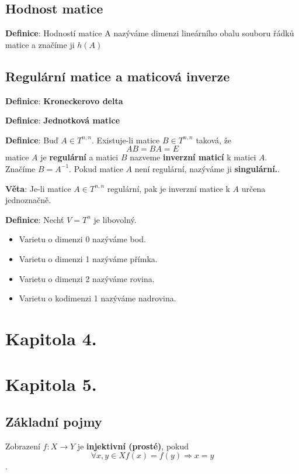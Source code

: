 \documentclass[12pt, letterpaper, twoside]{article}
\begin{document}
\subsection{Hodnost matice}

\textbf{Definice}: Hodností matice A nazýváme dimenzi lineárního obalu souboru řádků matice a značíme ji $h(A)$

\subsection{Regulární matice a maticová inverze}

\textbf{Definice}: \textbf{Kroneckerovo delta}

\textbf{Definice}: \textbf{Jednotková matice}

\textbf{Definice}: Buď $A \in T^{n,n}$. Existuje-li matice $B \in T^{n,n}$ taková, že
\[
    AB = BA = E
\] matice $A$ je \textbf{regulární} a matici $B$ nazveme \textbf{inverzní maticí} k matici $A$.
Značíme $B = A^{-1}$. Pokud matice $A$ není regulární, nazýváme ji \textbf{singulární.}.

\textbf{Věta}: Je-li matice $A \in T^{n,n}$ regulární, pak je inverzní matice k $A$ určena jednoznačně.

\textbf{Definice}: Nechť $V = T^n$ je libovolný.
\begin{itemize}
    \item Varietu o dimenzi 0 nazýváme bod.
    \item Varietu o dimenzi 1 nazýváme přímka.
    \item Varietu o dimenzi 2 nazýváme rovina.
    \item Varietu o kodimenzi 1 nazýváme nadrovina.
\end{itemize}

\section{Kapitola 4.}

\section{Kapitola 5.}

\subsection{Základní pojmy}

Zobrazení $f: X \to Y$ je \textbf{injektivní (prosté)}, pokud
\[\forall x,y \in X f(x) = f(y) \Rightarrow x = y\].
\end{document}

